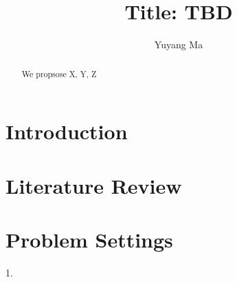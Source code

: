 \documentclass[preprint,review,11pt,authoryear]{elsarticle}
\begin{document}
\begin{frontmatter}

\title{Title: TBD}


\author[mymainaddress1]{Yuyang Ma}
\address[mymainaddress1]{Department of Industrial and Systems Engineering, Lehigh University, Bethlehem, PA,  USA}



\begin{abstract}


\noindent We propsose X, Y, Z

\begin{keyword} 

\end{keyword}



\end{abstract}
\end{frontmatter}

\section{Introduction} \label{sec:introduction}

\section{Literature Review}\label{sec:Review1}

\section{Problem Settings}\label{sec:ProvlemSettings}
1. \cite{dukkanci2023drones}
\end{document}
